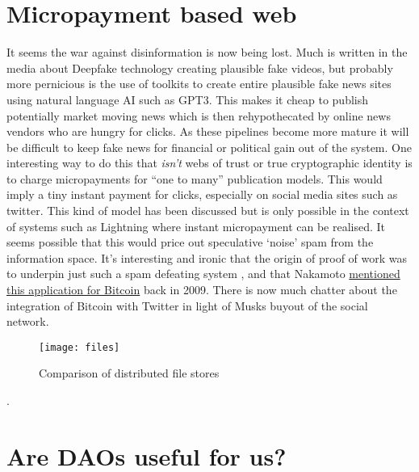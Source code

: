 \section{Micropayment based web}
It seems the war against disinformation is now being lost. Much is written in the media about Deepfake technology creating plausible fake videos, but probably more pernicious is the use of toolkits to create entire plausible fake news sites using natural language AI such as GPT3. This makes it cheap to publish potentially market moving news which is then rehypothecated by online news vendors who are hungry for clicks. As these pipelines become more mature it will be difficult to keep fake news for financial or political gain out of the system. One interesting way to do this that \textit{isn't} webs of trust or true cryptographic identity is to charge micropayments for ``one to many'' publication models. This would imply a tiny instant payment for clicks, especially on social media sites such as twitter. This kind of model has been discussed but is only possible in the context of systems such as Lightning where instant micropayment can be realised. It seems possible that this would price out speculative `noise' spam from the information space. It's interesting and ironic that the origin of proof of work was to underpin just such a spam defeating system  \cite{dwork1992pricing}, and that Nakamoto \href{https://www.metzdowd.com/pipermail/cryptography/2009-January/015014.html}{mentioned this application for Bitcoin} back in 2009. There is now much chatter about the integration of Bitcoin with Twitter in light of Musks buyout of the social network.
\begin{figure}
\texttt{[image: files]}
  \caption{Comparison of distributed file stores}
  \label{fig:Files}
\end{figure}. 
\section{Are DAOs useful for us?}

